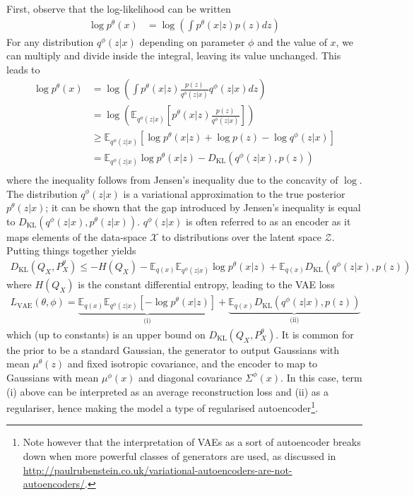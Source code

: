 First, observe that the log-likelihood can be written 
%
\begin{align*}
\log p^\theta(x) &= \log \left( \int p^\theta(x|z) p(z) dz \right)
\end{align*}
%
For any distribution $q^\phi(z|x)$ depending on parameter $\phi$ and the value of $x$, we can multiply and divide inside the integral, leaving its value unchanged.
This leads to
%
\begin{align*}
\log p^\theta(x) &= \log \left( \int p^\theta(x|z) \frac{p(z)}{q^\phi(z|x)} q^\phi(z|x) dz \right) \\
&= \log \left( \mathbb{E}_{q^\phi(z|x)} \left[  p^\theta(x|z) \frac{p(z)}{q^\phi(z|x)} \right]\right) \\
&\geq \mathbb{E}_{q^\phi(z|x)} \left[ \log p^\theta(x|z) + \log p(z) - \log q^\phi(z|x) \right] \\
&= \mathbb{E}_{q^\phi(z|x)} \log p^\theta(x|z)  - D_{\text{KL}}\left(q^\phi(z|x), p(z)\right) \\
\end{align*}
%
where the inequality follows from Jensen's inequality due to the concavity of $\log$.
The distribution $q^\phi(z|x)$ is a variational approximation to the true posterior $p^\theta(z|x)$; it can be shown that the gap introduced by Jensen's inequality is equal to $D_{\text{KL}}\left(q^\phi(z|x), p^\theta(z|x)\right)$. 
$q^\phi(z|x)$ is often referred to as an encoder as it maps elements of the data-space $\mathcal{X}$ to distributions over the latent space $\mathcal{Z}$.
Putting things together yields
%
\begin{align*}
D_{\text{KL}}(Q_X, P^\theta_X) \leq -H(Q_X)  - \mathbb{E}_{q(x)} \mathbb{E}_{q^\phi(z|x)} \log p^\theta(x|z) + \mathbb{E}_{q(x)}D_{\text{KL}}\left(q^\phi(z|x), p(z)\right)
\end{align*}
%
where $H(Q_X)$ is the constant differential entropy, leading to the VAE loss
%
\begin{align}
L_{\text{VAE}}(\theta, \phi) =  \underbrace{\mathbb{E}_{q(x)} \mathbb{E}_{q^\phi(z|x)} \left[ - \log p^\theta(x|z)\right]}_{\text{(i)}} + \underbrace{\mathbb{E}_{q(x)}D_{\text{KL}}\left(q^\phi(z|x), p(z)\right)}_{\text{(ii)}}
\end{align}
%
which (up to constants) is an upper bound on $D_{\text{KL}}(Q_X, P^\theta_X)$.
It is common for the prior to be a standard Gaussian, the generator to output Gaussians with mean $\mu^\theta(z)$ and fixed isotropic covariance, and the encoder to map to Gaussians with mean $\mu^\phi(x)$ and diagonal covariance $\Sigma^\phi(x)$.
In this case, term (i) above can be interpreted as an average reconstruction loss and (ii) as a regulariser, hence making the model a type of regularised autoencoder\footnote{Note however that the interpretation of VAEs as a sort of autoencoder breaks down when more powerful classes of generators are used, as discussed in \href{http://paulrubenstein.co.uk/variational-autoencoders-are-not-autoencoders/}{http://paulrubenstein.co.uk/variational-autoencoders-are-not-autoencoders/}.}.


